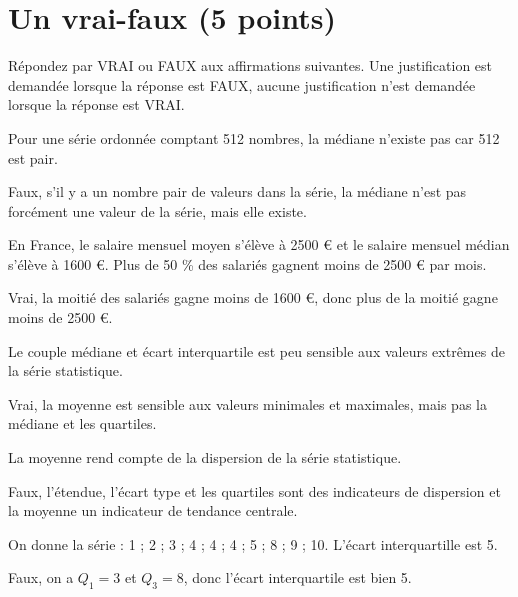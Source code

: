 \section{Un vrai-faux (5 points)}

Répondez par VRAI ou FAUX aux affirmations suivantes. Une justification est demandée lorsque la réponse est FAUX, aucune justification n'est demandée lorsque la réponse est VRAI.

\begin{questions}
	\question[1] Pour une série ordonnée comptant 512 nombres, la médiane n'existe pas car 512 est pair.
	\begin{solution}
		Faux, s'il y a un nombre pair de valeurs dans la série, la médiane n'est pas forcément une valeur de la série, mais elle existe.
	\end{solution}
	
	\question[1] En France, le salaire mensuel moyen s'élève à \num{2500} € et le salaire mensuel médian s'élève à \num{1600} €. Plus de 50 \% des salariés gagnent moins de \num{2500} € par mois.
	\begin{solution}
		Vrai, la moitié des salariés gagne moins de \num{1600} €, donc plus de la moitié gagne moins de \num{2500} €.
	\end{solution}
	
	\question[1] Le couple médiane et écart interquartile est peu sensible aux valeurs extrêmes de la série statistique.
	\begin{solution}
		Vrai, la moyenne est sensible aux valeurs minimales et maximales, mais pas la médiane et les quartiles.
	\end{solution}
	
	\question[1] La moyenne rend compte de la dispersion de la série statistique.
	\begin{solution}
		Faux, l'étendue, l'écart type et les quartiles sont des indicateurs de dispersion et la moyenne un indicateur de tendance centrale.
	\end{solution}
	
	
	\question[1] On donne la série : 1 ; 2 ; 3 ; 4 ; 4 ; 4 ; 5 ; 8 ; 9 ; 10. L'écart interquartille est 5.
	\begin{solution}
		Faux, on a $Q_1 = 3$ et $Q_3 = 8$, donc l'écart interquartile est bien 5.
	\end{solution}
\end{questions}